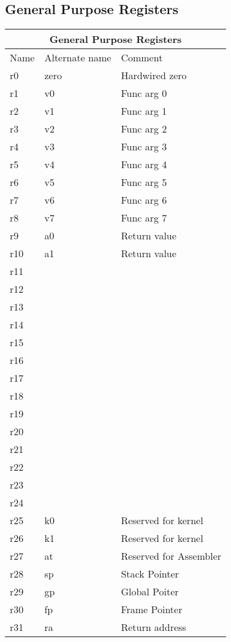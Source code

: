 \subsection{General Purpose Registers}

\begin{tabular}{ |p{3cm}|p{3cm}|p{4cm}|  }
    \hline
    \multicolumn{3}{|c|}{General Purpose Registers} \\
    \hline
    Name& Alternate name & Comment \\
    \hline
    r0  & zero & Hardwired zero\\
    r1  & v0   & Func arg 0 \\
    r2  & v1   & Func arg 1 \\
    r3  & v2   & Func arg 2 \\
    r4  & v3   & Func arg 3 \\
    r5  & v4   & Func arg 4 \\
    r6  & v5   & Func arg 5 \\
    r7  & v6   & Func arg 6 \\
    r8  & v7   & Func arg 7 \\
    r9  & a0   & Return value \\
    r10 & a1   & Return value \\
    r11 &      &  \\
    r12 &      &  \\
    r13 &      &  \\
    r14 &      &  \\
    r15 &      &  \\
    r16 &      &  \\
    r17 &      &  \\
    r18 &      &  \\
    r19 &      &  \\
    r20 &      &  \\
    r21 &      &  \\
    r22 &      &  \\
    r23 &      &  \\
    r24 &      &  \\
    r25 & k0   &  Reserved for kernel \\
    r26 & k1   &  Reserved for kernel \\
    r27 & at   &  Reserved for Assembler \\
    r28 & sp   &  Stack Pointer \\
    r29 & gp   &  Global Poiter \\
    r30 & fp   &  Frame Pointer \\
    r31 & ra   &  Return address \\
    
    \hline
\end{tabular}

